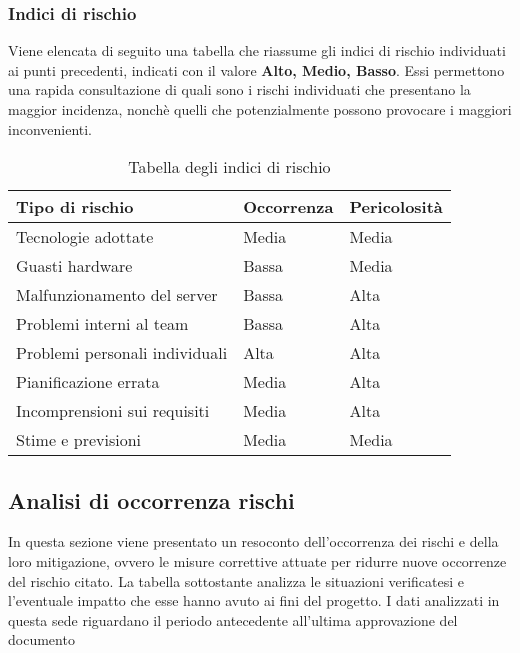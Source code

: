 \begin{minipage}{\linewidth}
	
\subsubsection{Indici di rischio}

Viene elencata di seguito una tabella che riassume gli indici di rischio individuati ai punti precedenti, indicati con il valore \textbf{Alto, Medio, Basso}. Essi permettono una rapida consultazione di quali sono i rischi individuati che presentano la maggior incidenza, nonchè quelli che potenzialmente possono provocare i maggiori inconvenienti. 

\begin{table}[H]
	\begin{center}
		\begin{tabular}{|p{5cm} | p{5cm} | p{5cm}|}
			\hline
			\textbf{Tipo di rischio}	& \textbf{Occorrenza} & \textbf{Pericolosità}\\
			\hline
			Tecnologie adottate	&	Media 	& 	Media	\\
			\hline
			Guasti hardware	&	Bassa 	& 	Media	\\
			\hline
			Malfunzionamento del server	&	Bassa 	& 	Alta	\\
			\hline
			Problemi interni al team	&	Bassa 	& 	Alta	\\
			\hline
			Problemi personali individuali	&	Alta 	& 	Alta	\\
			\hline
			Pianificazione errata	&	Media 	& 	Alta	\\
			\hline
			Incomprensioni sui requisiti	&	Media 	& 	Alta	\\
			\hline
			Stime e previsioni	&	Media 	& 	Media	\\
			\hline
		\end{tabular}
		\caption{Tabella degli indici di rischio}
	\end{center}
\end{table}
\end{minipage}

\subsection{Analisi di occorrenza rischi}
In questa sezione viene presentato un resoconto dell'occorrenza dei rischi e della loro mitigazione, ovvero le misure correttive attuate per ridurre nuove occorrenze del rischio citato. La tabella sottostante analizza le situazioni verificatesi e l'eventuale impatto che esse hanno avuto ai fini del progetto. I dati analizzati in questa sede riguardano il periodo antecedente all'ultima approvazione del documento

